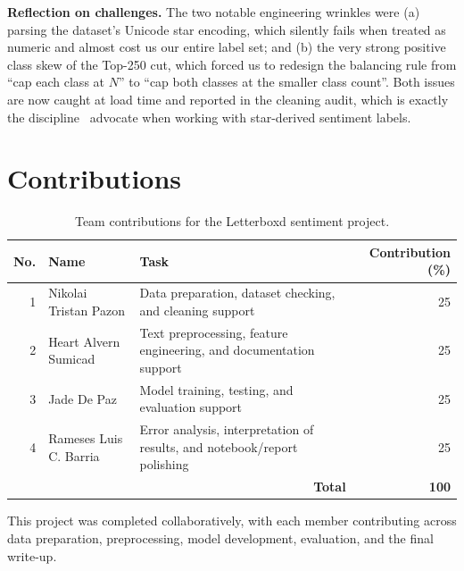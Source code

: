 \documentclass[11pt]{article}
\begin{document}
\textbf{Reflection on challenges.} The two notable engineering wrinkles were (a) parsing the dataset's Unicode star encoding, which silently fails when treated as numeric and almost cost us our entire label set; and (b) the very strong positive class skew of the Top-250 cut, which forced us to redesign the balancing rule from ``cap each class at $N$'' to ``cap both classes at the smaller class count''. Both issues are now caught at load time and reported in the cleaning audit, which is exactly the discipline~\citet{pang_lee_2008} advocate when working with star-derived sentiment labels.

\section{Contributions}
\label{sec:contrib}

\begin{table}[ht]
  \centering
  \footnotesize
  \caption{Team contributions for the Letterboxd sentiment project.}
  \label{tab:contrib}
  \begin{tabularx}{\linewidth}{@{}r l X r@{}}
    \toprule
    No. & Name & Task & Contribution (\%) \\
    \midrule
    1 & Nikolai Tristan Pazon & Data preparation, dataset checking, and cleaning support & 25 \\
    2 & Heart Alvern Sumicad & Text preprocessing, feature engineering, and documentation support & 25 \\
    3 & Jade De Paz & Model training, testing, and evaluation support & 25 \\
    4 & Rameses Luis C. Barria & Error analysis, interpretation of results, and notebook/report polishing & 25 \\
    \midrule
    \multicolumn{3}{r}{\textbf{Total}} & \textbf{100} \\
    \bottomrule
  \end{tabularx}
\end{table}

This project was completed collaboratively, with each member contributing across data preparation, preprocessing, model development, evaluation, and the final write-up.



\end{document}
